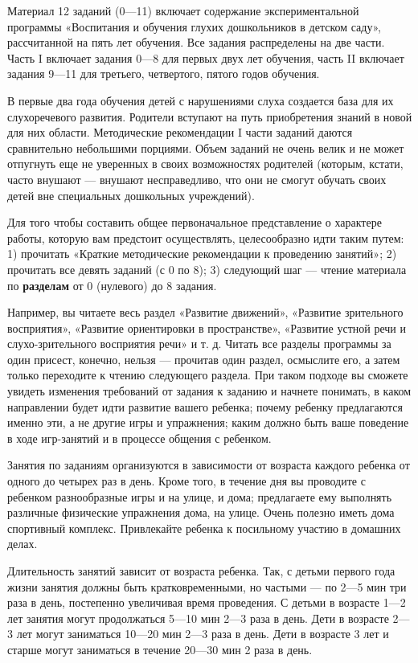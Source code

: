 \documentclass{book}
\begin{document}
Материал 12 заданий (0---11) включает содержание экспериментальной
программы «Воспитания и обучения глухих дошкольников в детском саду»,
рассчитанной на пять лет обучения. Все задания распределены на две
части. Часть I включает задания 0---8 для первых двух лет обучения,
часть II включает задания 9---11 для третьего, четвертого, пятого годов
обучения.

В первые два года обучения детей с нарушениями слуха создается база для
их слухоречевого развития. Родители вступают на путь приобретения знаний
в новой для них области. Методические рекомендации I части заданий
даются сравнительно небольшими порциями. Объем заданий не очень велик и
не может отпугнуть еще не уверенных в своих возможностях родителей
(которым, кстати, часто внушают --- внушают несправедливо, что они не
смогут обучать своих детей вне специальных дошкольных учреждений).

Для того чтобы составить общее первоначальное представление о характере
работы, которую вам предстоит осуществлять, целесообразно идти таким
путем: 1) прочитать «Краткие методические рекомендации к проведению
занятий»; 2) прочитать все девять заданий (с 0 по 8); 3) следующий шаг
--- чтение материала по \textbf{разделам} от 0 (нулевого) до 8 задания.

Например, вы читаете весь раздел «Развитие движений», «Развитие
зрительного восприятия», «Развитие ориентировки в пространстве»,
«Развитие устной речи и слухо-зрительного восприятия речи» и т. д.
Читать все разделы программы за один присест, конечно, нельзя ---
прочитав один раздел, осмыслите его, а затем только переходите к чтению
следующего раздела. При таком подходе вы сможете увидеть изменения
требований от задания к заданию и начнете понимать, в каком направлении
будет идти развитие вашего ребенка; почему ребенку предлагаются именно
эти, а не другие игры и упражнения; каким должно быть ваше поведение в
ходе игр-занятий и в процессе общения с ребенком.

Занятия по заданиям организуются в зависимости от возраста каждого
ребенка от одного до четырех раз в день. Кроме того, в течение дня вы
проводите с ребенком разнообразные игры и на улице, и дома; предлагаете
ему выполнять различные физические упражнения дома, на улице. Очень
полезно иметь дома спортивный комплекс. Привлекайте ребенка к посильному
участию в домашних делах.

Длительность занятий зависит от возраста ребенка. Так, с детьми первого
года жизни занятия должны быть кратковременными, но частыми --- по 2---5
мин три раза в день, постепенно увеличивая время проведения. С детьми в
возрасте 1---2 лет занятия могут продолжаться 5---10 мин 2---3 раза в
день. Дети в возрасте 2---3 лет могут заниматься 10---20 мин 2---3 раза
в день. Дети в возрасте 3 лет и старше могут заниматься в течение
20---30 мин 2 раза в день.
\end{document}
